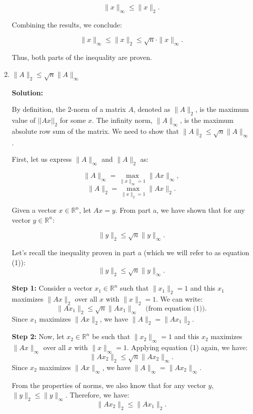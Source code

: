 \documentclass[11pt,onecolumn]{article}
\begin{document}
\begin{enumerate}
\[
\|x\|_{\infty} \leq \|x\|_{2}.
\]

Combining the results, we conclude:

\[
\|x\|_{\infty} \leq \|x\|_{2} \leq \sqrt{n} \cdot \|x\|_{\infty}.
\]

Thus, both parts of the inequality are proven.











    
\item $\|A\|_2 \leq \sqrt{n}\|A\|_{\infty}$

\textbf{Solution:}

By definition, the 2-norm of a matrix \( A \), denoted as \( \|A\|_2 \), is the maximum value of $||Ax||_{2}$ for some $x$. The infinity norm, \( \|A\|_{\infty} \), is the maximum absolute row sum of the matrix. We need to show that \( \|A\|_2 \leq \sqrt{n} \|A\|_{\infty} \).

First, let us express \( \|A\|_{\infty} \) and \( \|A\|_2 \) as:

\[
\|A\|_{\infty} = \max_{\|x\|_{\infty}=1} \|Ax\|_{\infty},
\]
\[
\|A\|_2 = \max_{\|x\|_2=1} \|Ax\|_2.
\]

Given a vector \( x \in \mathbb{R}^n \), let \( Ax = y \). From part a, we have shown that for any vector \( y \in \mathbb{R}^n \):

\[
\|y\|_2 \leq \sqrt{n} \|y\|_{\infty}.
\]

Let's recall the inequality proven in part a (which we will refer to as equation (1)):
\[
\|y\|_2 \leq \sqrt{n} \|y\|_{\infty}.
\]

\textbf{Step 1:} Consider a vector \( x_1 \in \mathbb{R}^n \) such that \( \|x_1\|_2 = 1 \) and this \( x_1 \) maximizes \( \|Ax\|_2 \) over all \( x \) with \( \|x\|_2 = 1 \). We can write:
\[
\|Ax_1\|_2 \leq \sqrt{n} \|Ax_1\|_{\infty} \quad \text{(from equation (1))}.
\]
Since \( x_1 \) maximizes \( \|Ax\|_2 \), we have \( \|A\|_2 = \|Ax_1\|_2 \).

\textbf{Step 2:} Now, let \( x_2 \in \mathbb{R}^n \) be such that \( \|x_2\|_{\infty} = 1 \) and this \( x_2 \) maximizes \( \|Ax\|_{\infty} \) over all \( x \) with \( \|x\|_{\infty} = 1 \). Applying equation (1) again, we have:
\[
\|Ax_2\|_2 \leq \sqrt{n} \|Ax_2\|_{\infty}.
\]
Since \( x_2 \) maximizes \( \|Ax\|_{\infty} \), we have \( \|A\|_{\infty} = \|Ax_2\|_{\infty} \).

From the properties of norms, we also know that for any vector \( y \), \( \|y\|_2 \leq \|y\|_{\infty} \). Therefore, we have:
\[
\|Ax_2\|_2 \leq \|Ax_1\|_2.
\]


\end{enumerate}
\end{document}
